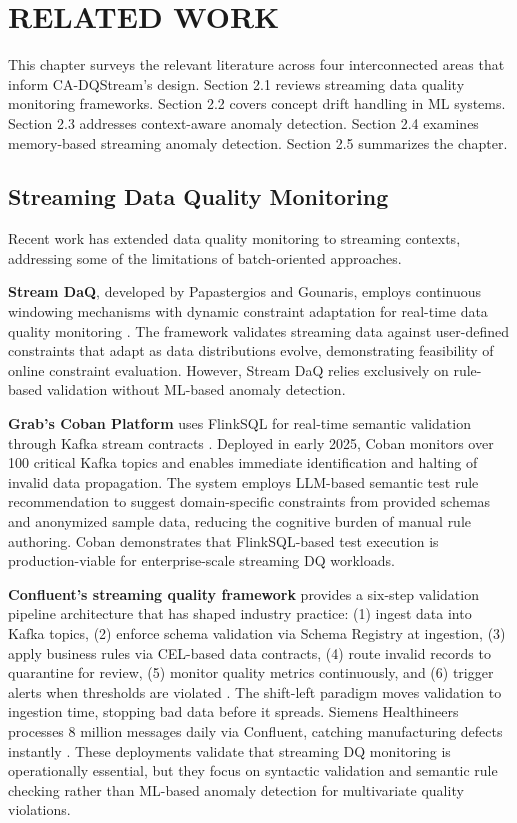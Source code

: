\chapter{RELATED WORK}

This chapter surveys the relevant literature across four interconnected areas that inform CA-DQStream's design. Section 2.1 reviews streaming data quality monitoring frameworks. Section 2.2 covers concept drift handling in ML systems. Section 2.3 addresses context-aware anomaly detection. Section 2.4 examines memory-based streaming anomaly detection. Section 2.5 summarizes the chapter.

\section{Streaming Data Quality Monitoring}

Recent work has extended data quality monitoring to streaming contexts, addressing some of the limitations of batch-oriented approaches.

\textbf{Stream DaQ}, developed by Papastergios and Gounaris, employs continuous windowing mechanisms with dynamic constraint adaptation for real-time data quality monitoring \citep{papastergios2025stream}. The framework validates streaming data against user-defined constraints that adapt as data distributions evolve, demonstrating feasibility of online constraint evaluation. However, Stream DaQ relies exclusively on rule-based validation without ML-based anomaly detection.

\textbf{Grab's Coban Platform} uses FlinkSQL for real-time semantic validation through Kafka stream contracts \citep{grab_coban2025}. Deployed in early 2025, Coban monitors over 100 critical Kafka topics and enables immediate identification and halting of invalid data propagation. The system employs LLM-based semantic test rule recommendation to suggest domain-specific constraints from provided schemas and anonymized sample data, reducing the cognitive burden of manual rule authoring. Coban demonstrates that FlinkSQL-based test execution is production-viable for enterprise-scale streaming DQ workloads.

\textbf{Confluent's streaming quality framework} provides a six-step validation pipeline architecture that has shaped industry practice: (1) ingest data into Kafka topics, (2) enforce schema validation via Schema Registry at ingestion, (3) apply business rules via CEL-based data contracts, (4) route invalid records to quarantine for review, (5) monitor quality metrics continuously, and (6) trigger alerts when thresholds are violated \citep{confluent_2025}. The shift-left paradigm moves validation to ingestion time, stopping bad data before it spreads. Siemens Healthineers processes 8 million messages daily via Confluent, catching manufacturing defects instantly \citep{siemens_confluent2024}. These deployments validate that streaming DQ monitoring is operationally essential, but they focus on syntactic validation and semantic rule checking rather than ML-based anomaly detection for multivariate quality violations.

